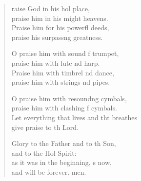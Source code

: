 \begin{verse}
  \begin{patverse}
raise God in his hol place,\Med\\
praise him in his might heavens.\\
Praise him for his powerfl deeds,\Med\\
praise his surpass\pointup{\i}ng greatness.

O praise him with sound f trumpet,\Med\\
praise him with lute nd harp.\\
Praise him with timbrel nd dance,\Med\\
praise him with strings nd pipes.

O praise him with resound\pointup{\i}ng cymbals,\Med\\
praise him with clashing f cymbals.\\
Let everything that lives and tht breathes\Med\\
give praise to th Lord.

Glory to the Father and to th Son,\Med\\
and to the Hol Spirit:\\
as it was in the beginning, \pointup{\i}s now,\Med\\
and will be forever. men. 
  \end{patverse}
\end{verse}
